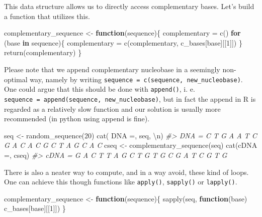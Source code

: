 \documentclass[
]{book}
\newenvironment{Shaded}{\begin{snugshade}}{\end{snugshade}}
\newcommand{\CommentTok}[1]{\textcolor[rgb]{0.56,0.35,0.01}{\textit{#1}}}
\newcommand{\ControlFlowTok}[1]{\textcolor[rgb]{0.13,0.29,0.53}{\textbf{#1}}}
\newcommand{\DecValTok}[1]{\textcolor[rgb]{0.00,0.00,0.81}{#1}}
\newcommand{\FunctionTok}[1]{\textcolor[rgb]{0.00,0.00,0.00}{#1}}
\newcommand{\NormalTok}[1]{#1}
\newcommand{\OtherTok}[1]{\textcolor[rgb]{0.56,0.35,0.01}{#1}}
\newcommand{\SpecialCharTok}[1]{\textcolor[rgb]{0.00,0.00,0.00}{#1}}
\newcommand{\StringTok}[1]{\textcolor[rgb]{0.31,0.60,0.02}{#1}}
\begin{document}
This data structure allows us to directly access complementary bases. Let's build a function that utilizes this.

\begin{Shaded}
\begin{Highlighting}[]
\NormalTok{complementary\_sequence }\OtherTok{\textless{}{-}} \ControlFlowTok{function}\NormalTok{(sequence)\{}
\NormalTok{  complementary }\OtherTok{=} \FunctionTok{c}\NormalTok{()}
  \ControlFlowTok{for}\NormalTok{ (base }\ControlFlowTok{in}\NormalTok{ sequence)\{}
\NormalTok{    complementary }\OtherTok{=} \FunctionTok{c}\NormalTok{(complementary, c\_bases[base][[}\DecValTok{1}\NormalTok{]])}
\NormalTok{  \}}
  \FunctionTok{return}\NormalTok{(complementary)}
\NormalTok{\}}
\end{Highlighting}
\end{Shaded}

Please note that we append complementary nucleobase in a seemingly non-optimal way, namely by writing \texttt{sequence\ =\ c(sequence,\ new\_nucleobase)}. One could argue that this should be done with \texttt{append()}, i. e. \texttt{sequence\ =\ append(sequence,\ new\_nucleobase)}, but in fact the append in R is regarded as a relatively slow function and our solution is usually more recommended (in python using append is fine).

\begin{Shaded}
\begin{Highlighting}[]
\NormalTok{seq }\OtherTok{\textless{}{-}} \FunctionTok{random\_sequence}\NormalTok{(}\DecValTok{20}\NormalTok{)}
\FunctionTok{cat}\NormalTok{(}\StringTok{\textquotesingle{} DNA =\textquotesingle{}}\NormalTok{, seq, }\StringTok{\textquotesingle{}}\SpecialCharTok{\textbackslash{}n}\StringTok{\textquotesingle{}}\NormalTok{)}
\CommentTok{\#\textgreater{}  DNA = C T G A A T C G A C A C G C T A G C A C}
\NormalTok{cseq }\OtherTok{\textless{}{-}} \FunctionTok{complementary\_sequence}\NormalTok{(seq)}
\FunctionTok{cat}\NormalTok{(}\StringTok{\textquotesingle{}cDNA =\textquotesingle{}}\NormalTok{, cseq)}
\CommentTok{\#\textgreater{} cDNA = G A C T T A G C T G T G C G A T C G T G}
\end{Highlighting}
\end{Shaded}

There is also a neater way to compute, and in a way avoid, these kind of loops. One can achieve this though functions like \texttt{apply()}, \texttt{sapply()} or \texttt{lapply()}.

\begin{Shaded}
\begin{Highlighting}[]
\NormalTok{complementary\_sequence }\OtherTok{\textless{}{-}} \ControlFlowTok{function}\NormalTok{(sequence)\{}
  \FunctionTok{sapply}\NormalTok{(seq, }\ControlFlowTok{function}\NormalTok{(base) c\_bases[base][[}\DecValTok{1}\NormalTok{]])}
\NormalTok{\}}
\end{Highlighting}
\end{Shaded}
\end{document}
